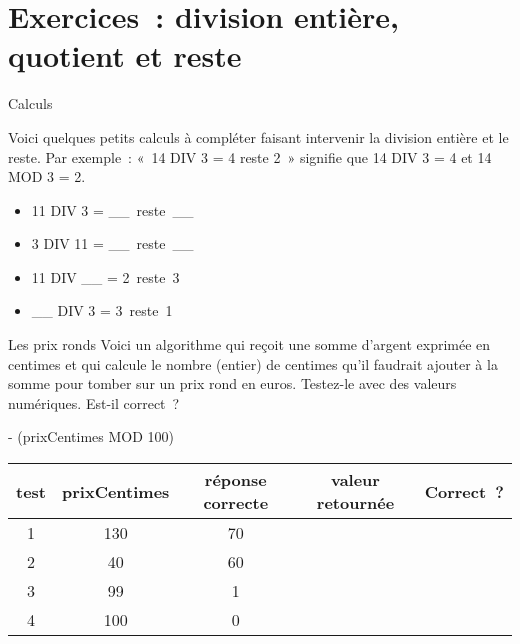 \clearpage
\section{Exercices~: division entière, quotient et reste}

\begin{Exercice}{Calculs}

	Voici quelques petits calculs à compléter faisant intervenir la division entière
	et le reste.  Par exemple~: «~14 DIV 3 = 4 reste 2~» signifie que 14 DIV 3 = 4 et
	14 MOD 3 = 2.

	\begin{multicols}{2}
		\begin{itemize}
			\item 11 DIV 3 = \_\_\ reste\ \_\_
			\item 3 DIV 11 = \_\_\ reste\ \_\_
			\item 11 DIV \_\_ = 2\ reste\ 3
			\item \_\_ DIV 3 = 3\ reste\ 1
		\end{itemize}
	\end{multicols}
\end{Exercice}

\begin{Exercice}{Les prix ronds}
	Voici un algorithme qui reçoit une somme d’argent exprimée en centimes
	et qui calcule le nombre (entier) de centimes qu’il
	faudrait ajouter à la somme pour tomber sur un prix rond en euros.
	Testez-le avec des valeurs numériques. Est-il correct~?

	\begin{pseudocode}
		 - (prixCentimes MOD 100)
	\EndAlgo
\end{pseudocode}

\begin{center}
	\begin{tabular}{|c|c|c|c|c|}
		\hline
		test \no & prixCentimes & réponse correcte & valeur retournée & Correct~? \\\hline
		\hline 
		1 & 130 & 70 &  & \\\hline
		2 & 40  & 60 &  & \\\hline
		3 & 99  & 1  &  & \\\hline
		4 & 100 & 0  &  & \\\hline
	\end{tabular}
\end{center}

\end{Exercice}

